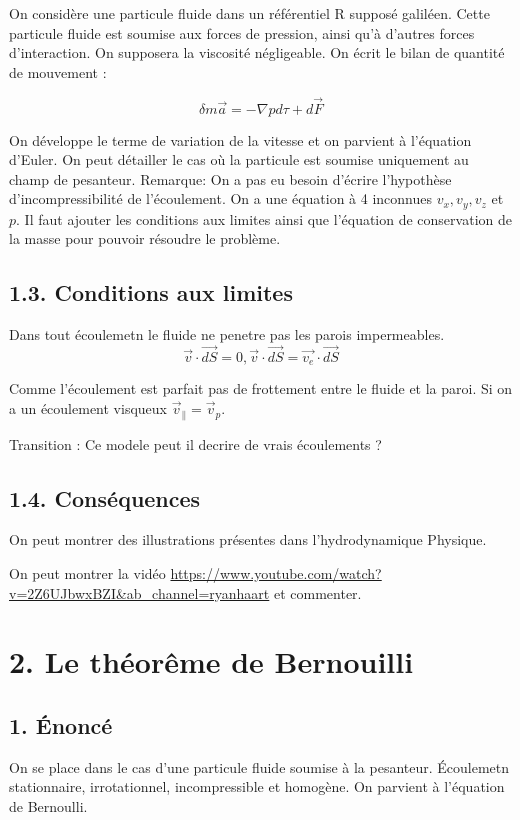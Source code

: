 \documentclass[french, a4paper, 10pt, twocolumn, landscape]{article}
\begin{document}
On considère une particule fluide dans un référentiel R supposé galiléen. Cette particule fluide est soumise aux forces de pression, ainsi qu'à d'autres forces d'interaction. On supposera la viscosité négligeable. On écrit le bilan de quantité de mouvement : 

\begin{equation}
  \delta m \vec{a} = -\nabla p d\tau +d\vec{F}
\end{equation}

On développe le terme de variation de la vitesse et on parvient à l'équation d'Euler. On peut détailler le cas où la particule est soumise uniquement au champ de pesanteur. Remarque: On a pas eu besoin d'écrire l'hypothèse d'incompressibilité de l'écoulement. On a une équation à 4 inconnues $v_x, v_y, v_z$ et $p$.  Il faut ajouter les conditions aux limites ainsi que l'équation de conservation de la masse pour pouvoir résoudre le problème.

\subsection*{1.3. Conditions aux limites}

Dans tout écoulemetn le fluide ne penetre pas les parois impermeables.
\begin{equation}
  \vec{v}\cdot\vec{dS}=0, \vec{v}\cdot\vec{dS}=\vec{v_e}\cdot\vec{dS}
\end{equation}

Comme l'écoulement est parfait pas de frottement entre le fluide et la paroi. Si on a un écoulement visqueux $\vec{v}_\parallel = \vec{v}_p$.

Transition : Ce modele peut il decrire de vrais écoulements ?

\subsection*{1.4. Conséquences}

On peut montrer des illustrations présentes dans l'hydrodynamique Physique.

On peut montrer la vidéo \url{https://www.youtube.com/watch?v=2Z6UJbwxBZI&ab_channel=ryanhaart} et commenter.


\section*{2. Le théorême de Bernouilli}

\subsection*{1. Énoncé}
On se place dans le cas d'une particule fluide soumise à la pesanteur. Écoulemetn stationnaire, irrotationnel, incompressible et homogène. On parvient à l'équation de Bernoulli.
\end{document}
